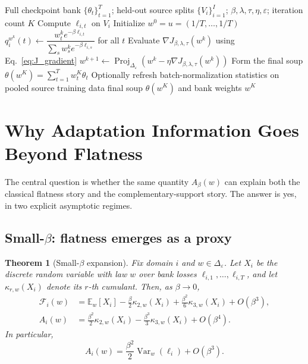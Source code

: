 \documentclass{article}
\newtheorem{theorem}{Theorem}
\newcommand{\EE}{\mathbb{E}}
\newcommand{\Var}{\operatorname{Var}}
\newcommand{\proj}{\operatorname{Proj}}
\newcommand{\simplex}{\Delta}
\newcommand{\maiwa}{\textup{\textsc{MAIWA}}}
\newcommand{\epssimplex}{\simplex_{\varepsilon}}
\newcommand{\free}{\mathcal{F}}
\begin{document}
\begin{algorithm}[t]
    \caption{\maiwa{} (\textsc{Minimum Adaptation Information Weight Averaging})}
    \label{alg:maiwa}
    \begin{algorithmic}[1]
        \Require Full checkpoint bank \(\{\theta_t\}_{t=1}^{T}\); held-out source splits \(\{V_i\}_{i=1}^{I}\); \(\beta,\lambda,\tau,\eta,\varepsilon\); iteration count \(K\)
                \State Compute \(\ell_{i,t}\) on \(V_i\)
            \EndFor
        \EndFor
        \State Initialize \(w^0 = u = (1/T,\dots,1/T)\)
                \State \(q_i^{w^k}(t) \gets \dfrac{w^k_t e^{-\beta \ell_{i,t}}}{\sum_s w^k_s e^{-\beta \ell_{i,s}}}\) for all \(t\)
            \EndFor
            \State Evaluate \(\nabla J_{\beta,\lambda,\tau}(w^k)\) using Eq.~\eqref{eq:J_gradient}
            \State \(w^{k+1} \gets \proj_{\epssimplex}(w^k - \eta \nabla J_{\beta,\lambda,\tau}(w^k))\)
        \EndFor
        \State Form the final soup \(\theta(w^K) = \sum_{t=1}^{T} w^K_t \theta_t\)
        \State Optionally refresh batch-normalization statistics on pooled source training data
        \State \Return final soup \(\theta(w^K)\) and bank weights \(w^K\)
    \end{algorithmic}
\end{algorithm}

\section{Why Adaptation Information Goes Beyond Flatness}
\label{sec:theory}

The central question is whether the same quantity \(A_\beta(w)\) can explain both the classical flatness story and the complementary-support story. The answer is yes, in two explicit asymptotic regimes.

\subsection{Small-\(\beta\): flatness emerges as a proxy}

\begin{theorem}[Small-\(\beta\) expansion]
\label{thm:small_beta}
Fix domain \(i\) and \(w \in \epssimplex\). Let \(X_i\) be the discrete random variable with law \(w\) over bank losses \(\ell_{i,1},\dots,\ell_{i,T}\), and let \(\kappa_{r,w}(X_i)\) denote its \(r\)-th cumulant. Then, as \(\beta \to 0\),
\begin{align}
    \free_i(w)
    &=
    \EE_w[X_i]
    - \frac{\beta}{2}\kappa_{2,w}(X_i)
    + \frac{\beta^2}{6}\kappa_{3,w}(X_i)
    + O(\beta^3), \label{eq:free_small_beta}\\
    A_i(w)
    &=
    \frac{\beta^2}{2}\kappa_{2,w}(X_i)
    - \frac{\beta^3}{3}\kappa_{3,w}(X_i)
    + O(\beta^4). \label{eq:Ai_small_beta}
\end{align}
In particular,
\begin{equation}
    A_i(w) = \frac{\beta^2}{2}\Var_w(\ell_i) + O(\beta^3).
\end{equation}
\end{theorem}
\end{document}
